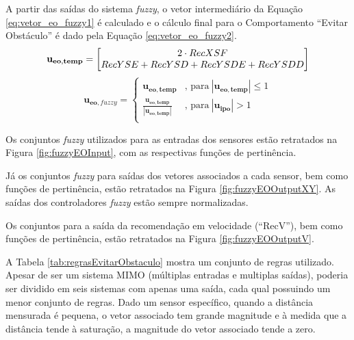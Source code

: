 	
	
	A partir das saídas do sistema \textit{fuzzy}, o vetor intermediário da Equação 
	\ref{eq:vetor_eo_fuzzy1} é calculado e o cálculo final para o Comportamento ``Evitar 
	Obstáculo'' é dado pela Equação \ref{eq:vetor_eo_fuzzy2}.
	\begin{equation}
		\label{eq:vetor_eo_fuzzy1}
			\mathbf{u_{eo,temp}} = 
			\mleft[
			\begin{matrix}
		  		2 \cdot RecXSF \\
		  		RecYSE + RecYSD + RecYSDE + RecYSDD \\
			\end{matrix}
			\mright]
	\end{equation}
	\begin{equation}
		\label{eq:vetor_eo_fuzzy2}
			\mathbf{u_{eo,\mathit{fuzzy}}} = 
			\begin{cases}
				\mathbf{u_{eo,temp}} & \text{, para} \ | \mathbf{u_{eo,temp}} | \leq 1 \\
				\frac{\mathbf{u_{eo,temp}}}{| \mathbf{u_{eo,temp}} |} & \text{, para} \ | \mathbf{u_{ipo}} | > 1 \\
			\end{cases}
	\end{equation}
	
	Os conjuntos \textit{fuzzy} utilizados para as entradas dos sensores estão retratados na
	Figura \ref{fig:fuzzyEOInput}, com as respectivas funções de pertinência. 
	
	
	
	Já os conjuntos \textit{fuzzy} para saídas dos vetores associados a cada sensor, bem como 
	funções de pertinência, estão retratados na Figura \ref{fig:fuzzyEOOutputXY}. As saídas dos
	controladores \textit{fuzzy} estão sempre normalizadas.
	
	
	
	Os conjuntos para a saída da recomendação em velocidade (``RecV''), bem como funções de
	pertinência, estão retratados na Figura \ref{fig:fuzzyEOOutputV}.
	
	
	
	A Tabela \ref{tab:regrasEvitarObstaculo} mostra um conjunto de regras utilizado. Apesar de 
	ser um sistema MIMO (múltiplas entradas e multiplas saídas), poderia ser dividido em seis 
	sistemas com apenas uma saída, cada qual possuindo um menor conjunto de regras. Dado um 
	sensor específico, quando a distância mensurada é pequena, o vetor associado tem grande 
	magnitude e à medida que a distância tende à saturação, a magnitude do vetor associado 
	tende a zero. 
	
